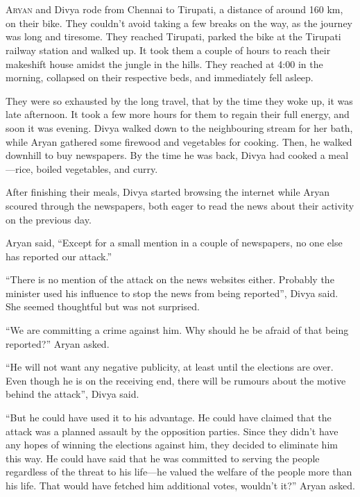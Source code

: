 \chapter{}
\lettrine{A}{ryan} and Divya rode from Chennai to Tirupati, a distance of around
160 km, on their bike.  They couldn't avoid taking a few breaks on the way, as
the journey was long and tiresome. They reached Tirupati, parked the bike at the
Tirupati railway station and walked up.  It took them a couple of hours to reach
their makeshift house amidst the jungle in the hills. They reached at 4:00 in
the morning, collapsed on their respective beds, and immediately fell asleep.

They were so exhausted by the long travel, that by the time they woke up, it was
late afternoon. It took a few more hours for them to regain their full energy,
and soon it was evening. Divya walked down to the neighbouring stream for her
bath, while Aryan gathered some firewood and vegetables for cooking. Then, he
walked downhill to buy newspapers. By the time he was back, Divya had cooked a
meal—rice, boiled vegetables, and curry.

After finishing their meals, Divya started browsing the internet while Aryan
scoured through the newspapers, both eager to read the news about their activity
on the previous day.

Aryan said, “Except for a small mention in a couple of newspapers, no one else
has reported our attack.”

“There is no mention of the attack on the news websites either. Probably the
minister used his influence to stop the news from being reported”, Divya said.
She seemed thoughtful but was not surprised.

“We are committing a crime against him. Why should he be afraid of that being
reported?” Aryan asked.

“He will not want any negative publicity, at least until the elections are over.
Even though he is on the receiving end, there will be rumours about the motive
behind the attack”, Divya said.

“But he could have used it to his advantage. He could have claimed that the
attack was a planned assault by the opposition parties. Since they didn't have
any hopes of winning the elections against him, they decided to eliminate him
this way. He could have said that he was committed to serving the people
regardless of the threat to his life—he valued the welfare of the people more
than his life. That would have fetched him additional votes, wouldn't it?” Aryan
asked.

